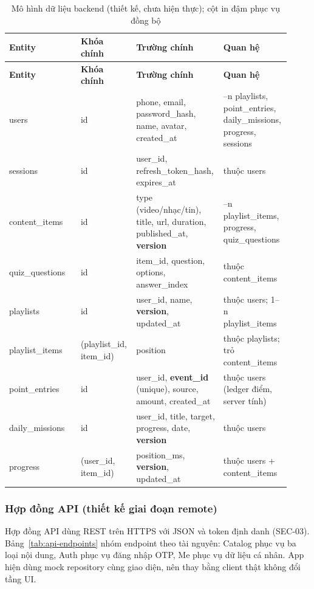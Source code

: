 \begingroup
\small
\renewcommand{\arraystretch}{1.15}
\setlength{\tabcolsep}{3pt}
\begin{longtable}{>{\RaggedRight\arraybackslash}p{0.25\linewidth}>{\RaggedRight\arraybackslash}p{0.17\linewidth}>{\RaggedRight\arraybackslash}p{0.29\linewidth}>{\RaggedRight\arraybackslash}p{0.21\linewidth}}
\caption{Mô hình dữ liệu backend (thiết kế, chưa hiện thực); cột in đậm phục vụ đồng bộ}
\label{tab:erd-backend}\\
\toprule
\textbf{Entity} & \textbf{Khóa chính} & \textbf{Trường chính} & \textbf{Quan hệ} \\
\midrule
\endfirsthead
\toprule
\textbf{Entity} & \textbf{Khóa chính} & \textbf{Trường chính} & \textbf{Quan hệ} \\
\midrule
\endhead
\bottomrule
\endfoot
users & id & phone, email, password\_hash, name, avatar, created\_at & 1--n playlists, point\_entries, daily\_missions, progress, sessions \\
sessions & id & user\_id, refresh\_token\_hash, expires\_at & thuộc users \\
content\_items & id & type (video/nhạc/tin), title, url, duration, published\_at, \textbf{version} & 1--n playlist\_items, progress, quiz\_questions \\
quiz\_questions & id & item\_id, question, options, answer\_index & thuộc content\_items \\
playlists & id & user\_id, name, \textbf{version}, updated\_at & thuộc users; 1--n playlist\_items \\
playlist\_items & (playlist\_id, item\_id) & position & thuộc playlists; trỏ content\_items \\
point\_entries & id & user\_id, \textbf{event\_id} (unique), source, amount, created\_at & thuộc users (ledger điểm, server tính) \\
daily\_missions & id & user\_id, title, target, progress, date, \textbf{version} & thuộc users \\
progress & (user\_id, item\_id) & position\_ms, \textbf{version}, updated\_at & thuộc users + content\_items \\
\end{longtable}
\endgroup

\subsubsection{Hợp đồng API (thiết kế giai đoạn remote)}
\label{sec:api-contract}

Hợp đồng API dùng REST trên HTTPS với JSON và token định danh (SEC-03). Bảng~\ref{tab:api-endpoints} nhóm endpoint theo tài nguyên: Catalog phục vụ ba loại nội dung, Auth phục vụ đăng nhập OTP, Me phục vụ dữ liệu cá nhân. App hiện dùng mock repository cùng giao diện, nên thay bằng client thật không đổi tầng UI.


